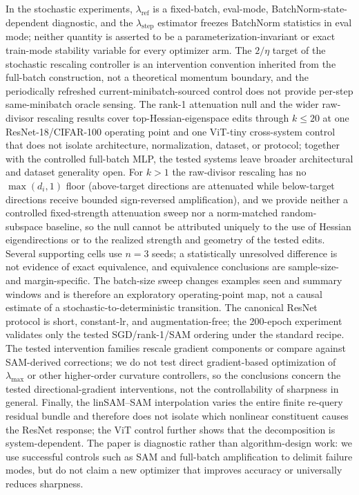 \documentclass{article}
\theoremstyle{plain}
\theoremstyle{definition}
\theoremstyle{remark}
\newcommand{\lmax}{\lambda_{\max}}
\newcommand{\lref}{\ensuremath{\lambda_{\mathrm{ref}}}}
\newcommand{\lstep}{\ensuremath{\lambda_{\mathrm{step}}}}
\begin{document}
In the stochastic experiments, $\lref$ is a fixed-batch, eval-mode,
BatchNorm-state-dependent diagnostic, and the $\lstep$ estimator
freezes BatchNorm statistics in eval mode; neither quantity is
asserted to be a parameterization-invariant or exact train-mode
stability variable for every optimizer arm. The $2/\eta$ target of
the stochastic rescaling controller is an intervention convention
inherited from the full-batch construction, not a theoretical
momentum boundary, and the periodically refreshed
current-minibatch-sourced control does not provide per-step
same-minibatch oracle sensing. The rank-1 attenuation null and the
wider raw-divisor rescaling results cover top-Hessian-eigenspace
edits through $k{\le}20$ at one ResNet-18/CIFAR-100 operating point
and one ViT-tiny cross-system control that does not isolate
architecture, normalization, dataset, or protocol; together with the
controlled full-batch MLP, the tested systems leave broader
architectural and dataset generality open. For $k{>}1$ the
raw-divisor rescaling has no $\max(d_i,1)$ floor (above-target
directions are attenuated while below-target directions receive
bounded sign-reversed amplification), and we provide neither a
controlled fixed-strength attenuation sweep nor a norm-matched
random-subspace baseline, so the null cannot be attributed uniquely
to the use of Hessian eigendirections or to the realized strength
and geometry of the tested edits. Several supporting cells use
$n{=}3$ seeds; a statistically unresolved difference is not evidence
of exact equivalence, and equivalence conclusions are sample-size-
and margin-specific. The batch-size sweep changes examples seen and
summary windows and is therefore an exploratory operating-point map,
not a causal estimate of a stochastic-to-deterministic transition.
The canonical ResNet protocol is short, constant-lr, and
augmentation-free; the 200-epoch experiment validates only the
tested SGD/rank-1/SAM ordering under the standard recipe. The tested
intervention families rescale gradient components or compare against
SAM-derived corrections; we do not test direct gradient-based
optimization of $\lmax$ or other higher-order curvature controllers,
so the conclusions concern the tested directional-gradient
interventions, not the controllability of sharpness in general.
Finally, the linSAM--SAM interpolation varies the entire finite
re-query residual bundle and therefore does not isolate which
nonlinear constituent causes the ResNet response; the ViT control
further shows that the decomposition is system-dependent. The paper
is diagnostic rather than algorithm-design work: we use successful
controls such as SAM and full-batch amplification to delimit failure
modes, but do not claim a new optimizer that improves accuracy or
universally reduces sharpness.
\end{document}
